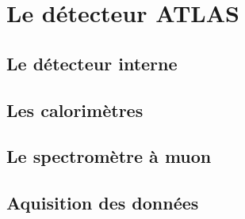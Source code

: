 
\section{Le détecteur ATLAS}
\label{sec:lhc_atlas:atlas}

\subsection{Le détecteur interne}
\label{sec:lhc_atlas:atlas:indet}

\subsection{Les calorimètres}
\label{sec:lhc_atlas:atlas:calo}

\subsection{Le spectromètre à muon}
\label{sec:lhc_atlas:atlas:mu}

\subsection{Aquisition des données}
\label{sec:lhc_atlas:atlas:daq}

